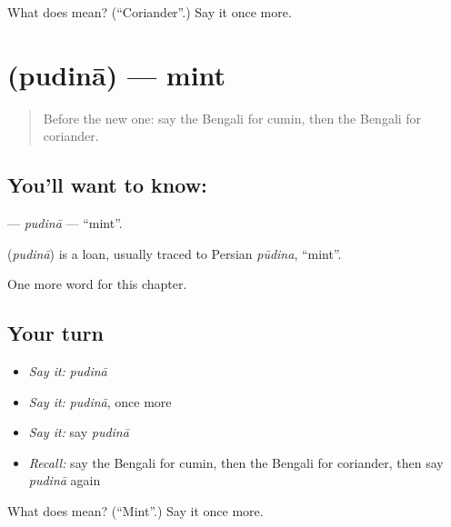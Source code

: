 \begin{tcolorbox}[breakable,colback=teal!4,colframe=teal!35!black,title={Before you move on}]
What does  mean? (\textquotedblleft{}Coriander\textquotedblright{}.) Say it once more.
\end{tcolorbox}
\section[\texorpdfstring{\bn{পুদিনা} (pudinā)}{পুদিনা (pudinā)}]{ (pudinā) — mint}

\label{lesson:BN-C249-pudina}



\begin{quote}
Before the new one: say the Bengali for cumin, then the Bengali for coriander.
\end{quote}

\subsection*{You'll want to know: }
\textbf{} — \emph{pudinā} — \textquotedblleft{}mint\textquotedblright{}.

\begin{cousinweb}
\textbf{} (\emph{pudinā}) is a loan, usually traced to Persian \emph{pūdina}, \textquotedblleft{}mint\textquotedblright{}.
\end{cousinweb}

\begin{grammarlens}[title={What you've built}]
One more word for this chapter.
\end{grammarlens}

\subsection*{Your turn}
\begin{itemize}
\raggedright
  \item \emph{Say it:} \emph{pudinā}
  \item \emph{Say it:} \emph{pudinā}, once more
  \item \emph{Say it:} say \emph{pudinā}
  \item \emph{Recall:} say the Bengali for cumin, then the Bengali for coriander, then say \emph{pudinā} again
\end{itemize}

\begin{tcolorbox}[breakable,colback=teal!4,colframe=teal!35!black,title={Before you move on}]
What does  mean? (\textquotedblleft{}Mint\textquotedblright{}.) Say it once more.
\end{tcolorbox}

